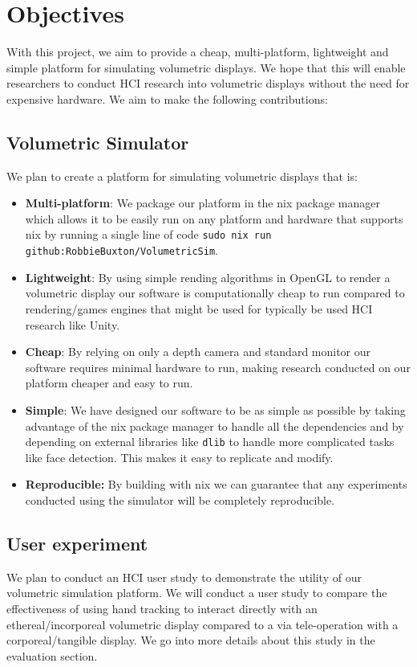 \section{Objectives}

With this project, we aim to provide a cheap, multi-platform, lightweight and simple platform for simulating volumetric displays. We hope that this will enable researchers to conduct HCI research into volumetric displays without the need for expensive hardware. We aim to make the following contributions:
\subsection{Volumetric Simulator}
We plan to create a platform for simulating volumetric displays that is:
\begin{itemize}
  \item \textbf{Multi-platform}: We package our platform in the nix package manager \cite{dolstra2004nix} which allows it to be easily run on any platform and hardware that supports nix by running a single line of code \texttt{sudo nix run github:RobbieBuxton/VolumetricSim}.

  \item \textbf{Lightweight}: By using simple rending algorithms in OpenGL \cite{rost2009opengl} to render a volumetric display our software is computationally cheap to run compared to rendering/games engines that might be used for typically be used HCI research like Unity.

  \item \textbf{Cheap}: By relying on only a depth camera and standard monitor our software requires minimal hardware to run, making research conducted on our platform cheaper and easy to run.

  \item \textbf{Simple}: We have designed our software to be as simple as possible by taking advantage of the nix package manager to handle all the dependencies and by depending on external libraries like \texttt{dlib} \cite{10.5555/1577069.1755843} to handle more complicated tasks like face detection. This makes it easy to replicate and modify.

  \item \textbf{Reproducible:} By building with nix we can guarantee that any experiments conducted using the simulator will be completely reproducible.
\end{itemize}

\subsection{User experiment}
We plan to conduct an HCI user study to demonstrate the utility of our volumetric simulation platform. We will conduct a user study to compare the effectiveness of using hand tracking to interact directly with an ethereal/incorporeal volumetric display compared to a via tele-operation with a corporeal/tangible display. We go into more details about this study in the evaluation section.
